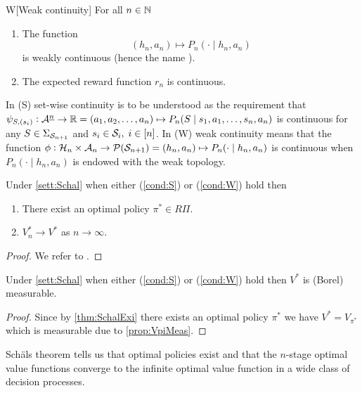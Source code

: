 \begin{cond}{W}[Weak continuity]
  For all $n \in \mathbb{N}$ 
  \begin{enumerate}
    \item The function
      \[(h_n, a_n) \mapsto P_n(\cdot \mid h_n, a_n)\]
	is weakly continuous (hence the name ).
    \item The expected reward function $r_n$ is continuous.
  \end{enumerate}
  \label{cond:W}
\end{cond}

\begin{rem}
  In (S) set-wise continuity is to be understood as the requirement that
  $\psi_{S, (s_i)} : \mathcal{A}^{\underline{n}} \to \mathbb{R} = (a_1, a_2, \dots, a_n) \mapsto
  P_n(S \mid s_1, a_1, \dots, s_n, a_n)$
  is continuous for any $S \in \Sigma_{\mathcal{S}_{n+1}}$ and 
  $s_i \in \mathcal{S}_i, \; i \in [n]$.
  In (W) weak continuity means that the function
  $\phi: \mathcal{H}_n \times \mathcal{A}_n \to \mathcal{P}(\mathcal{S}_{n+1}) = (h_n, a_n)
  \mapsto P_n(\cdot \mid h_n, a_n)$
  is continuous when $P_n(\cdot \mid h_n, a_n)$ is endowed with the 
  weak topology.
\end{rem}

\begin{thm}[Schäl]
  Under \cref{sett:Schal} when either (\cref{cond:S}) or (\cref{cond:W}) hold
  then
  \begin{enumerate}
    \item There exist an optimal policy $\pi^* \in R\Pi$.
    \item $V^*_n \to V^*$ as $n \to \infty$.
  \end{enumerate}
  \label{thm:SchalExi}
\end{thm}
\begin{proof}
  We refer to . %
\end{proof}

\begin{cor}\label{cor:SchalCor}
  Under \cref{sett:Schal} when either (\cref{cond:S}) or (\cref{cond:W}) hold then
  $V^*$ is (Borel) measurable.
\end{cor}
\begin{proof}
  Since by \cref{thm:SchalExi} there exists an optimal policy $\pi^*$ we have
  $V^* = V_{\pi^*}$ which is measurable due to \cref{prop:VpiMeas}.
\end{proof}

Schäls theorem tells us that optimal policies exist and that the $n$-stage optimal value functions converge to the infinite optimal value function in a wide class
of decision processes.

